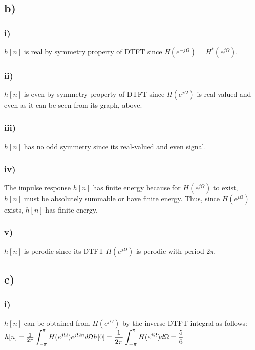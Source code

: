 \documentclass[12pt]{article}
\begin{document}
    \subsection*{b)}
    \subsubsection*{i)}
    \(h[n]\) is real by symmetry property of DTFT since \(H(e^{-j\Omega}) = H^{*}(e^{j\Omega})\).
    \subsubsection*{ii)}
    \(h[n]\) is even by symmetry property of DTFT since \(H(e^{j\Omega})\) is real-valued and even as it can be seen from its graph, above. 
    \subsubsection*{iii)}
      \(h[n]\) has no odd symmetry since its real-valued and even signal. 
    \subsubsection*{iv)}
     The impulse response \(h[n]\) has finite energy because for \(H(e^{j \Omega})\) to exist, \(h[n]\) must be absolutely summable or have finite energy. Thus, since \(H(e^{j \Omega})\) exists, \(h[n]\) has finite energy.
    \subsubsection*{v)}
    \(h[n]\) is perodic since its DTFT \(H(e^{j \Omega})\) is perodic with period \(2\pi\). 
    \subsection*{c)}
    \subsubsection*{i)}
    \(h[n]\) can be obtained from \(H(e^{j\Omega}) \) by the inverse DTFT integral as follows: \\
    \begin{math}
    h[n] = \frac{1}{2\pi} \displaystyle\int_{-\pi}^{\pi} H(e^{j\Omega}) e^{j\Omega n} d\Omega \\ 
    h[0] = \frac{1}{2\pi} \displaystyle\int_{-\pi}^{\pi} H(e^{j\Omega}) d\Omega = \frac{5}{6}
    \end{math} 
\end{document}

